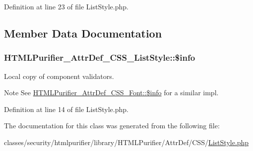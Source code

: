 Definition at line 23 of file List\+Style.\+php.



\subsection{Member Data Documentation}
\hypertarget{classHTMLPurifier__AttrDef__CSS__ListStyle_ab3f5f0e24f511e97940de1af26a6eaba}{
\subsubsection[{\$info}]{\setlength{\rightskip}{0pt plus 5cm}H\+T\+M\+L\+Purifier\+\_\+\+Attr\+Def\+\_\+\+C\+S\+S\+\_\+\+List\+Style\+::\$info\hspace{0.3cm}{\ttfamily [protected]}}}\label{classHTMLPurifier__AttrDef__CSS__ListStyle_ab3f5f0e24f511e97940de1af26a6eaba}
Local copy of component validators. \begin{DoxyNote}{Note}
See \hyperlink{classHTMLPurifier__AttrDef__CSS__Font_a18be00fdfbebb2803a53d1590569f05e}{H\+T\+M\+L\+Purifier\+\_\+\+Attr\+Def\+\_\+\+C\+S\+S\+\_\+\+Font\+::\$info} for a similar impl. 
\end{DoxyNote}


Definition at line 14 of file List\+Style.\+php.



The documentation for this class was generated from the following file\+:\begin{DoxyCompactItemize}
\item 
classes/security/htmlpurifier/library/\+H\+T\+M\+L\+Purifier/\+Attr\+Def/\+C\+S\+S/\hyperlink{ListStyle_8php}{List\+Style.\+php}\end{DoxyCompactItemize}
